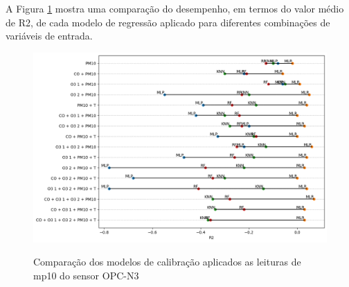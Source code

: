 A Figura \ref{fig:data-pm10-all-models-comparison} mostra uma comparação do desempenho, em termos do valor médio de R2, de cada modelo de regressão aplicado para diferentes combinações de variáveis de entrada.

\begin{figure}[h]
    \centering
    \caption{Comparação dos modelos de calibração aplicados as leituras de \acrshort{mp10} do sensor OPC-N3}
    \includegraphics[width=\textwidth]{chapters/3-RESULTADOS CAMPO/Figuras/pm10-all-models-comparison.png}
    \label{fig:data-pm10-all-models-comparison}
\end{figure}
